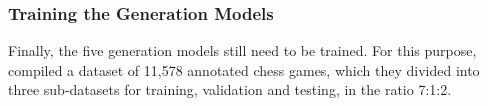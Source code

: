 \subsubsection{Training the Generation Models}

Finally, the five generation models still need to be trained. For this purpose, \cite{jhamtani-etal-2018-learning} compiled a dataset of 11,578 annotated chess games, which they divided into three sub-datasets for training, validation and testing, in the ratio 7:1:2.